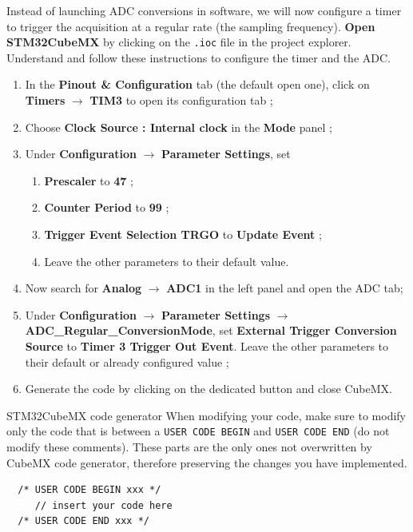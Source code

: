 Instead of launching ADC conversions in software, we will now configure a timer to trigger the acquisition at a regular rate (the sampling frequency). \textbf{Open STM32CubeMX} by clicking on the \texttt{.ioc} file in the project explorer. Understand and follow these instructions to configure the timer and the ADC.
\begin{enumerate}
    \item In the \textbf{Pinout \& Configuration} tab (the default open one), click on \textbf{Timers} $\rightarrow$ \textbf{TIM3} to open its configuration tab ;
    \item Choose \textbf{Clock Source : Internal clock} in the \textbf{Mode} panel ;
    \item Under \textbf{Configuration} $\rightarrow$ \textbf{Parameter Settings}, set
        \begin{enumerate}
            \item \textbf{Prescaler} to \textbf{47} ;
            \item \textbf{Counter Period} to \textbf{99} ;
            \item \textbf{Trigger Event Selection TRGO} to \textbf{Update Event} ;
            \item Leave the other parameters to their default value.
        \end{enumerate}
    \item Now search for \textbf{Analog} $\rightarrow$ \textbf{ADC1} in the left panel and open the ADC tab;
    \item Under \textbf{Configuration} $\rightarrow$ \textbf{Parameter Settings} $\rightarrow$ \textbf{ADC\_Regular\_ConversionMode}, set \textbf{External Trigger Conversion Source} to \textbf{Timer 3 Trigger Out Event}. Leave the other parameters to their default or already configured value ;
    \item Generate the code by clicking on the dedicated button and close CubeMX.
\end{enumerate}

\begin{bclogo}[couleur = gray!20, arrondi = 0.2, logo=\bcattention]{STM32CubeMX code generator}
When modifying your code, make sure to modify only the code that is between a \texttt{USER CODE BEGIN} and \texttt{USER CODE END} (do not modify these comments). These parts are the only ones not overwritten by CubeMX code generator, therefore preserving the changes you have implemented.
\begin{lstlisting}
  /* USER CODE BEGIN xxx */
     // insert your code here
  /* USER CODE END xxx */
\end{lstlisting}
\end{bclogo}

